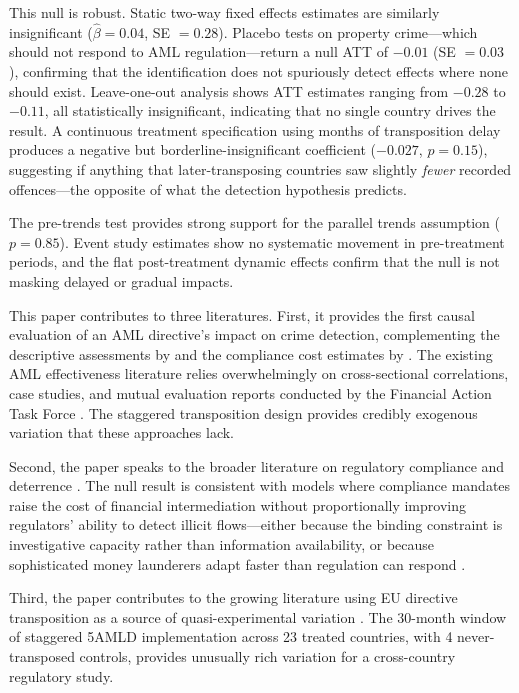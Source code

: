 \documentclass[12pt]{article}
\begin{document}
This null is robust. Static two-way fixed effects estimates are similarly insignificant ($\hat\beta = 0.04$, SE $= 0.28$). Placebo tests on property crime---which should not respond to AML regulation---return a null ATT of $-0.01$ (SE $= 0.03$), confirming that the identification does not spuriously detect effects where none should exist. Leave-one-out analysis shows ATT estimates ranging from $-0.28$ to $-0.11$, all statistically insignificant, indicating that no single country drives the result. A continuous treatment specification using months of transposition delay produces a negative but borderline-insignificant coefficient ($-0.027$, $p = 0.15$), suggesting if anything that later-transposing countries saw slightly \textit{fewer} recorded offences---the opposite of what the detection hypothesis predicts.

The pre-trends test provides strong support for the parallel trends assumption ($p = 0.85$). Event study estimates show no systematic movement in pre-treatment periods, and the flat post-treatment dynamic effects confirm that the null is not masking delayed or gradual impacts.

This paper contributes to three literatures. First, it provides the first causal evaluation of an AML directive's impact on crime detection, complementing the descriptive assessments by \citet{pol2020} and the compliance cost estimates by \citet{lexisnexis2022}. The existing AML effectiveness literature relies overwhelmingly on cross-sectional correlations, case studies, and mutual evaluation reports conducted by the Financial Action Task Force \citep{fatf2012,ferwerda2020}. The staggered transposition design provides credibly exogenous variation that these approaches lack.

Second, the paper speaks to the broader literature on regulatory compliance and deterrence \citep{becker1968,stigler1970}. The null result is consistent with models where compliance mandates raise the cost of financial intermediation without proportionally improving regulators' ability to detect illicit flows---either because the binding constraint is investigative capacity rather than information availability, or because sophisticated money launderers adapt faster than regulation can respond \citep{findley2014,sharman2011}.

Third, the paper contributes to the growing literature using EU directive transposition as a source of quasi-experimental variation \citep{kalemli2024,bris2016,berlingieri2024}. The 30-month window of staggered 5AMLD implementation across 23 treated countries, with 4 never-transposed controls, provides unusually rich variation for a cross-country regulatory study.
\end{document}
